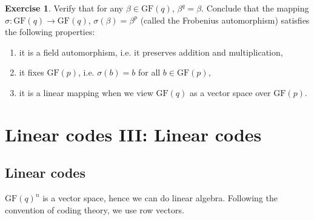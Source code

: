 \documentclass[a4paper, 11pt, openany]{book}
\numberwithin{equation}{section}
\theoremstyle{plain}
\theoremstyle{definition}
\newtheorem{exercise}   {Exercise}  [section]
\newcommand{\GF}{\mathrm{GF}}
\begin{document}
\begin{exercise}
Verify that for any $\beta \in \GF(q)$, $\beta^q = \beta$. Conclude that the mapping $\sigma: \GF(q) \to \GF(q)$, $\sigma(\beta) = \beta^p$ (called the Frobenius automorphism) satisfies the following properties:
\begin{enumerate}
    \item it is a field automorphism, i.e. it preserves addition and multiplication,
    
    \item it fixes $\GF(p)$, i.e. $\sigma(b) = b$ for all $b \in \GF(p)$,
    
    \item it is a linear mapping when we view $\GF(q)$ as a vector space over $\GF(p)$.
\end{enumerate}
\end{exercise}



































\section{Linear codes III: Linear codes}
\label{sec:23}





\subsection{Linear codes}

$\GF(q)^n$ is a vector space, hence we can do linear algebra. Following the convention of coding theory, we use row vectors.
\end{document}
